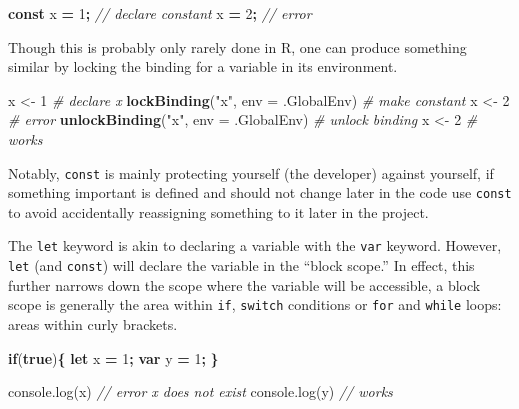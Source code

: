 \documentclass[
  10pt,
]{krantz}
\makeatletter
\newenvironment{Shaded}{\begin{snugshade}}{\end{snugshade}}
\newcommand{\AttributeTok}[1]{\textcolor[rgb]{0.61,0.61,0.61}{#1}}
\newcommand{\CommentTok}[1]{\textcolor[rgb]{0.37,0.37,0.37}{\textit{#1}}}
\newcommand{\ControlFlowTok}[1]{\textcolor[rgb]{0.27,0.27,0.27}{\textbf{#1}}}
\newcommand{\DataTypeTok}[1]{\textcolor[rgb]{0.27,0.27,0.27}{#1}}
\newcommand{\DecValTok}[1]{\textcolor[rgb]{0.06,0.06,0.06}{#1}}
\newcommand{\KeywordTok}[1]{\textcolor[rgb]{0.27,0.27,0.27}{\textbf{#1}}}
\newcommand{\NormalTok}[1]{#1}
\newcommand{\OperatorTok}[1]{\textcolor[rgb]{0.43,0.43,0.43}{\textbf{#1}}}
\newcommand{\StringTok}[1]{\textcolor[rgb]{0.5,0.5,0.5}{#1}}
\newcommand{\VariableTok}[1]{\textcolor[rgb]{0,0,0}{#1}}
\newenvironment{kframe}{%
\medskip{}
\setlength{\fboxsep}{.8em}
 \def\at@end@of@kframe{}%
 \ifinner\ifhmode%
  \def\at@end@of@kframe{\end{minipage}}%
  \begin{minipage}{\columnwidth}%
 \fi\fi%
 \def\FrameCommand##1{\hskip\@totalleftmargin \hskip-\fboxsep
 \colorbox{shadecolor}{##1}\hskip-\fboxsep
     \hskip-\linewidth \hskip-\@totalleftmargin \hskip\columnwidth}%
 \MakeFramed {\advance\hsize-\width
   \@totalleftmargin\z@ \linewidth\hsize
   \@setminipage}}%
 {\par\unskip\endMakeFramed%
 \at@end@of@kframe}
\renewenvironment{Shaded}{\begin{kframe}}{\end{kframe}}
\makeatother
\begin{document}
\begin{Shaded}
\begin{Highlighting}[]
\KeywordTok{const}\NormalTok{ x }\OperatorTok{=} \DecValTok{1}\OperatorTok{;} \CommentTok{// declare constant}
\NormalTok{x }\OperatorTok{=} \DecValTok{2}\OperatorTok{;} \CommentTok{// error}
\end{Highlighting}
\end{Shaded}

Though this is probably only rarely done in R, one can produce something similar by locking the binding for a variable in its environment.

\begin{Shaded}
\begin{Highlighting}[]
\NormalTok{x <{-}}\StringTok{ }\DecValTok{1} \CommentTok{\# declare x}
\KeywordTok{lockBinding}\NormalTok{(}\StringTok{"x"}\NormalTok{, }\DataTypeTok{env =}\NormalTok{ .GlobalEnv) }\CommentTok{\# make constant}
\NormalTok{x <{-}}\StringTok{ }\DecValTok{2} \CommentTok{\# error}
\KeywordTok{unlockBinding}\NormalTok{(}\StringTok{"x"}\NormalTok{, }\DataTypeTok{env =}\NormalTok{ .GlobalEnv) }\CommentTok{\# unlock binding}
\NormalTok{x <{-}}\StringTok{ }\DecValTok{2} \CommentTok{\# works}
\end{Highlighting}
\end{Shaded}

Notably, \texttt{const} is mainly protecting yourself (the developer) against yourself, if something important is defined and should not change later in the code use \texttt{const} to avoid accidentally reassigning something to it later in the project.

The \texttt{let} keyword is akin to declaring a variable with the \texttt{var} keyword. However, \texttt{let} (and \texttt{const}) will declare the variable in the ``block scope.'' In effect, this further narrows down the scope where the variable will be accessible, a block scope is generally the area within \texttt{if}, \texttt{switch} conditions or \texttt{for} and \texttt{while} loops: areas within curly brackets.

\begin{Shaded}
\begin{Highlighting}[]
\ControlFlowTok{if}\NormalTok{(}\KeywordTok{true}\NormalTok{)}\OperatorTok{\{}
  \KeywordTok{let}\NormalTok{ x }\OperatorTok{=} \DecValTok{1}\OperatorTok{;}
  \KeywordTok{var}\NormalTok{ y }\OperatorTok{=} \DecValTok{1}\OperatorTok{;}
\OperatorTok{\}}

\VariableTok{console}\NormalTok{.}\AttributeTok{log}\NormalTok{(x) }\CommentTok{// error x does not exist}
\VariableTok{console}\NormalTok{.}\AttributeTok{log}\NormalTok{(y) }\CommentTok{// works}
\end{Highlighting}
\end{Shaded}
\end{document}

